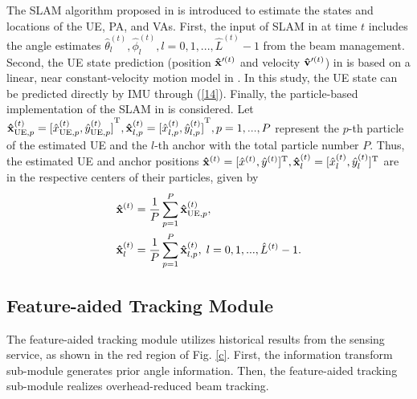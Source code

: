 \documentclass[journal,12pt,onecolumn,draftclsnofoot,]{IEEEtran}
\begin{document}
The SLAM algorithm proposed in \cite{a6} is introduced to estimate the states and locations of the UE, PA, and VAs.
First, the input of SLAM in \cite{a6} at time $t$ includes the angle estimates $\hat \theta _l^{(t )},\hat \phi _l^{(t )},l = 0,1, ...,{\hat L}^{(t )} - 1$ from the beam management. 
Second, the UE state prediction (position ${\bf{\hat x}}{'^{(t )}}$ and velocity ${{\bf{\hat v}}'^{(t )}}$) in \cite{a6} is based on a linear, near constant-velocity motion model in \cite{a19}. In this study, the UE state can be predicted directly by IMU through (\ref{14}). 
Finally, the particle-based implementation of the SLAM in \cite{a6} is considered. 
Let ${\bf{\hat x}}_{{\rm UE},p}^{(t )}={{{[ {\hat x_{{\rm UE},p}^{(t )},\hat y_{{\rm UE},p}^{(t )}} ]}^{\rm T}}},{\bf{\hat x}}_{l,p}^{(t )}={{{[ {\hat x_{l,p}^{(t )},\hat y_{l,p}^{(t )}} ]}^{\rm T}}},p=1,...,P$ represent the $p$-th particle of the estimated UE and the $l$-th anchor with the total particle number $P$. 
Thus, the estimated UE and anchor positions ${{\bf{\hat x}}^{(t)}}= {[ {{{\hat x}^{({t} )}},{{\hat y}^{(t )}}} ]^{\rm T}},{\bf{\hat x}}_l^{(t )}={[ {\hat x_l^{(t )},\hat y_l^{(t )}} ]^{\rm T}}$ are in the respective centers of their particles, given by
\begin{subequations}
\begin{align}\label{15}
{{\bf{\hat x}}^{\left(t \right)}}& = \frac{1}{P}\sum\limits_{p = 1}^P{\bf{\hat x}}_{{\rm UE},p}^{\left(t \right)},\\
{\bf{\hat x}}_l^{\left(t \right)}& = \frac{1}{P}\sum\limits_{p = 1}^P {\bf{\hat x}}_{l,p}^{\left(t \right)},\;l = 0,1, ..., {\hat L}^{\left(t \right)} - 1.
\end{align}
\end{subequations}


\vspace{-2.5mm}
\subsection{Feature-aided Tracking Module}
The feature-aided tracking module utilizes historical results from the sensing service, as shown in the red region of Fig. \ref{c}. 
First, the information transform sub-module generates prior angle information. Then, the feature-aided tracking sub-module realizes overhead-reduced beam tracking. 
\end{document}
